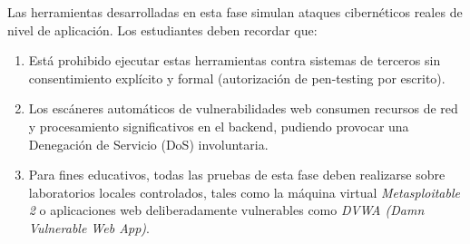 \documentclass[12pt,letterpaper]{article}
\begin{document}
Las herramientas desarrolladas en esta fase simulan ataques cibernéticos reales de nivel de aplicación. Los estudiantes deben recordar que:
\begin{enumerate}
    \item Está prohibido ejecutar estas herramientas contra sistemas de terceros sin consentimiento explícito y formal (autorización de pen-testing por escrito).
    \item Los escáneres automáticos de vulnerabilidades web consumen recursos de red y procesamiento significativos en el backend, pudiendo provocar una Denegación de Servicio (DoS) involuntaria.
    \item Para fines educativos, todas las pruebas de esta fase deben realizarse sobre laboratorios locales controlados, tales como la máquina virtual \textit{Metasploitable 2} o aplicaciones web deliberadamente vulnerables como \textit{DVWA (Damn Vulnerable Web App)}.
\end{enumerate}
\end{document}

